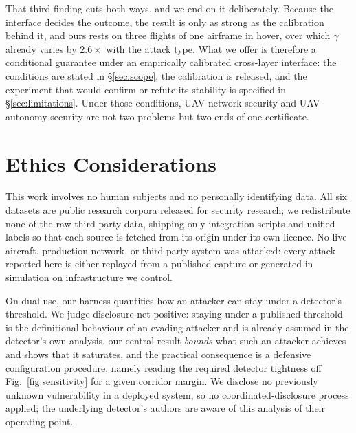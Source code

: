 That third finding cuts both ways, and we end on it deliberately. Because the
interface decides the outcome, the result is only as strong as the calibration
behind it, and ours rests on three flights of one airframe in hover, over which
$\gamma$ already varies by $2.6\times$ with the attack type. What we offer is
therefore a conditional guarantee under an empirically calibrated cross-layer
interface: the conditions are stated in \S\ref{sec:scope}, the calibration is
released, and the experiment that would confirm or refute its stability is
specified in \S\ref{sec:limitations}. Under those conditions, UAV network
security and UAV autonomy security are not two problems but two ends of one
certificate.

\section{Ethics Considerations}
\label{sec:ethics}
This work involves no human subjects and no personally identifying data. All six
datasets are public research corpora released for security research; we
redistribute none of the raw third-party data, shipping only integration scripts
and unified labels so that each source is fetched from its origin under its own
licence. No live aircraft, production network, or third-party system was
attacked: every attack reported here is either replayed from a published capture
or generated in simulation on infrastructure we control.

On dual use, our harness quantifies how an attacker can stay under a detector's
threshold. We judge disclosure net-positive: staying under a published threshold
is the definitional behaviour of an evading attacker and is already assumed in
the detector's own analysis, our central result \emph{bounds} what such an
attacker achieves and shows that it saturates, and the practical consequence is
a defensive configuration procedure, namely reading the required detector
tightness off Fig.~\ref{fig:sensitivity} for a given corridor margin. We
disclose no previously unknown vulnerability in a deployed system, so no
coordinated-disclosure process applied; the underlying detector's authors are
aware of this analysis of their operating point.


